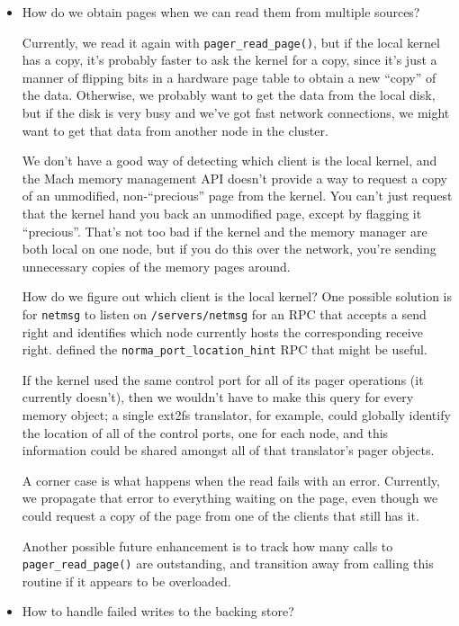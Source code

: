 \documentclass{article}
\def\netmsg{{\tt netmsg}\xspace}
\def\pagerreadpage{{\tt pager_read_page()}\xspace}
\begin{document}
\begin{itemize}
\item How do we obtain pages when we can read them from multiple sources?

  Currently, we read it again with {\tt pager_read_page()}, but if the
  local kernel has a copy, it's probably faster to ask the kernel for
  a copy, since it's just a manner of flipping bits in a hardware page
  table to obtain a new ``copy'' of the data.  Otherwise, we probably
  want to get the data from the local disk, but if the disk is very
  busy and we've got fast network connections, we might want to get
  that data from another node in the cluster.

  We don't have a good way of detecting which client is the local
  kernel, and the Mach memory management API doesn't provide a way to
  request a copy of an unmodified, non-``precious'' page from the
  kernel.  You can't just request that the kernel hand you back an
  unmodified page, except by flagging it ``precious''.  That's not too
  bad if the kernel and the memory manager are both local on one node,
  but if you do this over the network, you're sending unnecessary
  copies of the memory pages around.

  How do we figure out which client is the local kernel?  One possible
  solution is for \netmsg to listen on {\tt /servers/netmsg} for an
  RPC that accepts a send right and identifies which node currently
  hosts the corresponding receive right.  \cite{interfaces} defined
  the {\tt norma_port_location_hint} RPC that might be useful.

  If the kernel used the same control port for all of its pager
  operations (it currently doesn't), then we wouldn't have to make
  this query for every memory object; a single ext2fs translator, for
  example, could globally identify the location of all of the control
  ports, one for each node, and this information could be shared
  amongst all of that translator's pager objects.

  A corner case is what happens when the read fails with an error.
  Currently, we propagate that error to everything waiting on the
  page, even though we could request a copy of the page from one
  of the clients that still has it.

  Another possible future enhancement is to track how many calls
  to \pagerreadpage are outstanding, and transition away from calling
  this routine if it appears to be overloaded.

\item How to handle failed writes to the backing store?


\end{itemize}
\end{document}
